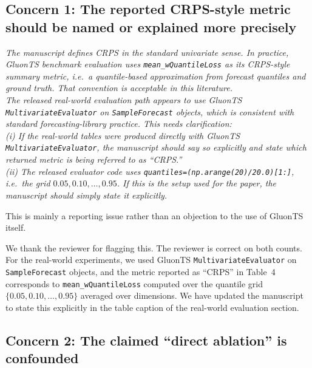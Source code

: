\documentclass[11pt]{article}
\newcommand{\reviewertext}[1]{%
  \begin{reviewerquote}
    {\color{reviewercolor}\itshape #1}
  \end{reviewerquote}%
}
\newcommand{\authorresponse}[1]{%
    #1\par\medskip
}
\begin{document}
\subsection{Concern 1: The reported CRPS-style metric should be named or explained more precisely}

\reviewertext{%
The manuscript defines CRPS in the standard univariate sense. In practice, GluonTS benchmark evaluation uses \texttt{mean\_wQuantileLoss} as its CRPS-style summary metric, i.e.\ a quantile-based approximation from forecast quantiles and ground truth. That convention is acceptable in this literature. \\
The released real-world evaluation path appears to use GluonTS \texttt{MultivariateEvaluator} on \texttt{SampleForecast} objects, which is consistent with standard forecasting-library practice.
This needs clarification:\\ (i) If the real-world tables were produced directly with GluonTS \texttt{MultivariateEvaluator}, the manuscript should say so explicitly and state which returned metric is being referred to as ``CRPS.''\\(ii) The released evaluator code uses 
\texttt{quantiles=(np.arange(20)/20.0)[1:]}, i.e.\ the grid $0.05, 0.10, \ldots, 0.95$. If this is the setup used for the paper, the manuscript should simply state it explicitly.

This is mainly a reporting issue rather than an objection to the use of GluonTS itself.
}

\authorresponse{%
We thank the reviewer for flagging this. The reviewer is correct on both counts. For the real-world experiments, we used GluonTS \texttt{MultivariateEvaluator} on \texttt{SampleForecast} objects, and the metric reported as ``CRPS'' in Table~4 corresponds to \texttt{mean\_wQuantileLoss} computed over the quantile grid $\{0.05, 0.10, \ldots, 0.95\}$ averaged over dimensions. We have updated the manuscript to state this explicitly in the table caption of the real-world evaluation section.}

\subsection{Concern 2: The claimed ``direct ablation'' is confounded}
\end{document}
